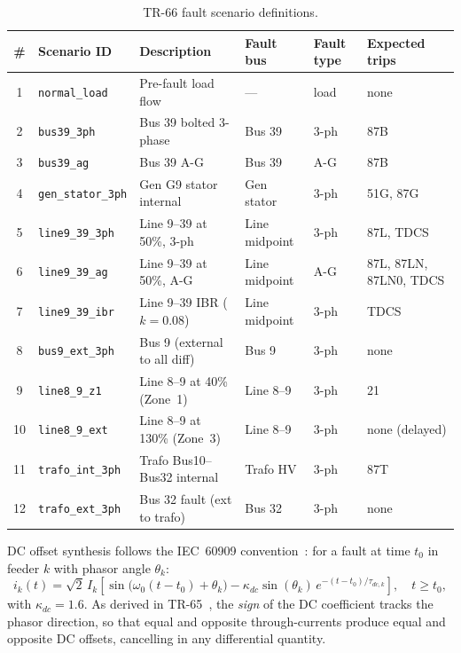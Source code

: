\documentclass[12pt,a4paper]{article}
\begin{document}
\begin{table}[H]
\centering
\caption{TR-66 fault scenario definitions.}
\label{tab:scenarios}
\setlength{\tabcolsep}{4pt}
\begin{tabular}{clllll}
\toprule
\# & Scenario ID & Description & Fault bus & Fault type & Expected trips \\
\midrule
1  & \texttt{normal\_load}    & Pre-fault load flow         & ---           & load   & none \\
2  & \texttt{bus39\_3ph}      & Bus 39 bolted 3-phase        & Bus 39        & 3-ph   & 87B \\
3  & \texttt{bus39\_ag}       & Bus 39 A-G                  & Bus 39        & A-G    & 87B \\
4  & \texttt{gen\_stator\_3ph}& Gen G9 stator internal       & Gen stator    & 3-ph   & 51G, 87G \\
5  & \texttt{line9\_39\_3ph}  & Line 9--39 at 50\%, 3-ph     & Line midpoint & 3-ph   & 87L, TDCS \\
6  & \texttt{line9\_39\_ag}   & Line 9--39 at 50\%, A-G      & Line midpoint & A-G    & 87L, 87LN, 87LN0, TDCS \\
7  & \texttt{line9\_39\_ibr}  & Line 9--39 IBR ($k=0.08$)   & Line midpoint & 3-ph   & TDCS \\
8  & \texttt{bus9\_ext\_3ph}  & Bus 9 (external to all diff) & Bus 9         & 3-ph   & none \\
9  & \texttt{line8\_9\_z1}    & Line 8--9 at 40\% (Zone~1)   & Line 8--9     & 3-ph   & 21 \\
10 & \texttt{line8\_9\_ext}   & Line 8--9 at 130\% (Zone~3)  & Line 8--9     & 3-ph   & none (delayed) \\
11 & \texttt{trafo\_int\_3ph} & Trafo Bus10--Bus32 internal  & Trafo HV      & 3-ph   & 87T \\
12 & \texttt{trafo\_ext\_3ph} & Bus 32 fault (ext to trafo)  & Bus 32        & 3-ph   & none \\
\bottomrule
\end{tabular}
\end{table}

DC offset synthesis follows the IEC~60909 convention~\citep{IEC60909}:
for a fault at time $t_0$ in feeder $k$ with phasor angle $\theta_k$:
\begin{equation}
  i_k(t) = \sqrt{2}\,I_k\!\left[
    \sin\!\bigl(\omega_0(t-t_0) + \theta_k\bigr)
    -\kappa_{dc}\sin(\theta_k)\,e^{-(t-t_0)/\tau_{dc,k}}
  \right], \quad t \geq t_0,
\end{equation}
with $\kappa_{dc} = 1.6$.  As derived in TR-65~\citep{SAMBP_TR65}, the
\emph{sign} of the DC coefficient tracks the phasor direction, so that equal
and opposite through-currents produce equal and opposite DC offsets, cancelling
in any differential quantity.
\end{document}
